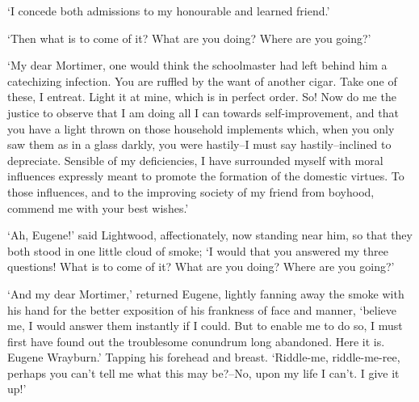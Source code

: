 ‘I concede both admissions to my honourable and learned friend.’

‘Then what is to come of it? What are you doing? Where are you going?’

‘My dear Mortimer, one would think the schoolmaster had left behind him
a catechizing infection. You are ruffled by the want of another cigar.
Take one of these, I entreat. Light it at mine, which is in perfect
order. So! Now do me the justice to observe that I am doing all I can
towards self-improvement, and that you have a light thrown on those
household implements which, when you only saw them as in a glass darkly,
you were hastily--I must say hastily--inclined to depreciate. Sensible
of my deficiencies, I have surrounded myself with moral influences
expressly meant to promote the formation of the domestic virtues.
To those influences, and to the improving society of my friend from
boyhood, commend me with your best wishes.’

‘Ah, Eugene!’ said Lightwood, affectionately, now standing near him,
so that they both stood in one little cloud of smoke; ‘I would that you
answered my three questions! What is to come of it? What are you doing?
Where are you going?’

‘And my dear Mortimer,’ returned Eugene, lightly fanning away the smoke
with his hand for the better exposition of his frankness of face and
manner, ‘believe me, I would answer them instantly if I could. But
to enable me to do so, I must first have found out the troublesome
conundrum long abandoned. Here it is. Eugene Wrayburn.’ Tapping his
forehead and breast. ‘Riddle-me, riddle-me-ree, perhaps you can’t tell
me what this may be?--No, upon my life I can’t. I give it up!’



